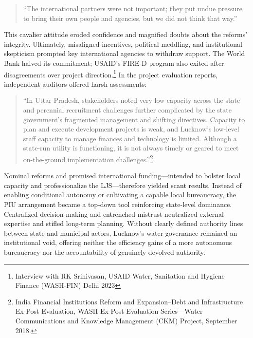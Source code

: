 \begin{quote} “The international partners were not important; they put undue pressure to bring their own people and agencies, but we did not think that way.” \end{quote}

This cavalier attitude eroded confidence and magnified doubts about the reforms’ integrity. Ultimately, misaligned incentives, political meddling, and institutional skepticism prompted key international agencies to withdraw support. The World Bank halved its commitment; USAID’s FIRE-D program also exited after disagreements over project direction.\footnote{Interview with RK Srinivasan, USAID Water, Sanitation and Hygiene Finance (WASH-FIN) Delhi 2023} In the project evaluation reports, independent auditors offered harsh assessments:

\begin{quote} “In Uttar Pradesh, stakeholders noted very low capacity across the state and perennial recruitment challenges further complicated by the state government’s fragmented management and shifting directives. Capacity to plan and execute development projects is weak, and Lucknow’s low-level staff capacity to manage finances and technology is limited. Although a state-run utility is functioning, it is not always timely or geared to meet on-the-ground implementation challenges.”\footnote{India Financial Institutions Reform and Expansion–Debt and Infrastructure Ex-Post Evaluation, WASH Ex-Post Evaluation Series—Water Communications and Knowledge Management (CKM) Project, September 2018.} \end{quote}

Nominal reforms and promised international funding—intended to bolster local capacity and professionalize the LJS—therefore yielded scant results. Instead of enabling conditional autonomy or cultivating a capable local bureaucracy, the PIU arrangement became a top-down tool reinforcing state-level dominance. Centralized decision-making and entrenched mistrust neutralized external expertise and stifled long-term planning. Without clearly defined authority lines between state and municipal actors, Lucknow’s water governance remained an institutional void, offering neither the efficiency gains of a more autonomous bureaucracy nor the accountability of genuinely devolved authority.

